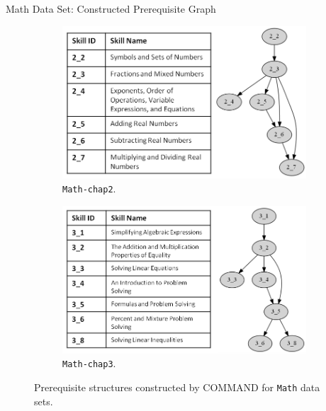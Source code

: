 \documentclass[hyperref={pdfpagelabels=false}]{beamer}
\begin{document}
\begin{frame}{Math Data Set: Constructed Prerequisite Graph}
	\begin{figure}[!ht]
		\centering
		\begin{subfigure}[b]{0.49\linewidth}
			\centering
			\includegraphics[width=0.95\linewidth]{figures/hed_chap2_structure_prob2.png}
			\caption{\texttt{Math-chap2}.}
			\label{fig:hed_chap2_structure}
		\end{subfigure}
		\begin{subfigure}[b]{0.49\linewidth}
			\centering
			\includegraphics[width=0.95\linewidth]{figures/hed_chap3_structure_prob2.png}
			\caption{\texttt{Math-chap3}.}
			\label{fig:hed_chap3_structure}
		\end{subfigure}%
		\caption{Prerequisite structures constructed by COMMAND for \texttt{Math} data sets.}
		\label{fig:hed-structures}
	\end{figure}		
	
\end{frame}
\end{document}
